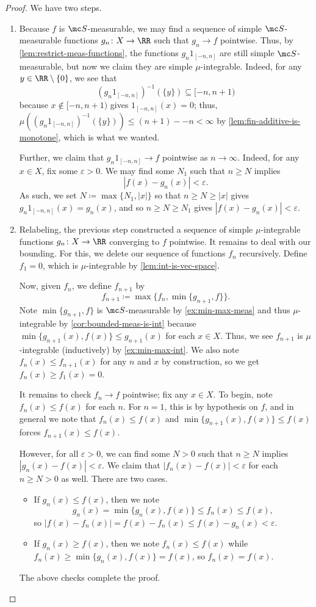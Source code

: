 \documentclass[../notes.tex]{subfiles}
\begin{document}
\begin{proof}
	We have two steps.
	\begin{enumerate}
		\item Because $f$ is $\mc S$-measurable, we may find a sequence of simple $\mc S$-measurable functions $g_n\colon X\to\RR$ such that $g_n\to f$ pointwise. Thus, by \autoref{lem:restrict-meas-functions}, the functions $g_n1_{[-n,n]}$ are still simple $\mc S$-measurable, but now we claim they are simple $\mu$-integrable. Indeed, for any $y\in\RR\setminus\{0\}$, we see that
		\[\left(g_n1_{[-n,n]}\right)^{-1}(\{y\})\subseteq[-n,n+1)\]
		because $x\notin[-n,n+1)$ gives $1_{[-n,n]}(x)=0$; thus, $\mu\left((g_n1_{[-n,n]})^{-1}(\{y\})\right)\le(n+1)--n<\infty$ by \autoref{lem:fin-additive-is-monotone}, which is what we wanted.
	
		Further, we claim that $g_n1_{[-n,n]}\to f$ pointwise as $n\to\infty$. Indeed, for any $x\in X$, fix some $\varepsilon>0$. We may find some $N_1$ such that $n\ge N$ implies
		\[|f(x)-g_n(x)|<\varepsilon.\]
		As such, we set $N\coloneqq\max\{N_1,|x|\}$ so that $n\ge N\ge|x|$ gives $g_n1_{[-n,n]}(x)=g_n(x)$, and so $n\ge N\ge N_1$ gives $|f(x)-g_n(x)|<\varepsilon$.
	
		\item Relabeling, the previous step constructed a sequence of simple $\mu$-integrable functions $g_n\colon X\to\RR$ converging to $f$ pointwise. It remains to deal with our bounding. For this, we delete our sequence of functions $f_n$ recursively. Define $f_1=0$, which is $\mu$-integrable by \autoref{lem:int-is-vec-space}.

		Now, given $f_n$, we define $f_{n+1}$ by
		\[f_{n+1}\coloneqq\max\{f_n,\min\{g_{n+1},f\}\}.\]
		Note $\min\{g_{n+1},f\}$ is $\mc S$-measurable by \autoref{ex:min-max-meas} and thus $\mu$-integrable by \autoref{cor:bounded-meas-is-int} because $\min\{g_{n+1}(x),f(x)\}\le g_{n+1}(x)$ for each $x\in X$. Thus, we see $f_{n+1}$ is $\mu$-integrable (inductively) by \autoref{ex:min-max-int}. We also note $f_n(x)\le f_{n+1}(x)$ for any $n$ and $x$ by construction, so we get $f_n(x)\ge f_1(x)=0$.

		It remains to check $f_n\to f$ pointwise; fix any $x\in X$. To begin, note $f_n(x)\le f(x)$ for each $n$. For $n=1$, this is by hypothesis on $f$, and in general we note that $f_n(x)\le f(x)$ and $\min\{g_{n+1}(x),f(x)\}\le f(x)$ forces $f_{n+1}(x)\le f(x)$.

		However, for all $\varepsilon>0$, we can find some $N>0$ such that $n\ge N$ implies $|g_n(x)-f(x)|<\varepsilon$. We claim that $|f_n(x)-f(x)|<\varepsilon$ for each $n\ge N>0$ as well. There are two cases.
		\begin{itemize}
			\item If $g_n(x)\le f(x)$, then we note
			\[g_n(x)=\min\{g_n(x),f(x)\}\le f_n(x)\le f(x),\]
			so $|f(x)-f_n(x)|=f(x)-f_n(x)\le f(x)-g_n(x)<\varepsilon$.
			\item If $g_n(x)\ge f(x)$, then we note $f_n(x)\le f(x)$ while $f_n(x)\ge\min\{g_n(x),f(x)\}=f(x)$, so $f_n(x)=f(x)$.
		\end{itemize}
		The above checks complete the proof.
		\qedhere
	\end{enumerate}
\end{proof}
\end{document}
